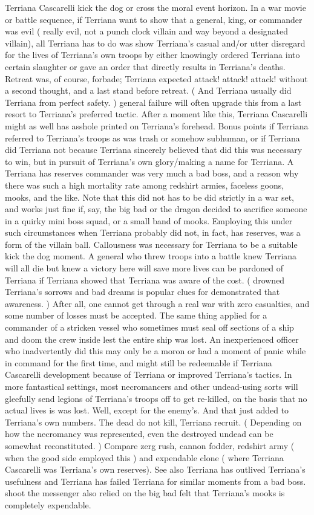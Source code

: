 \documentclass[12pt]{book}
\begin{document}
Terriana Cascarelli kick the dog or cross the moral event horizon. In a war movie or battle sequence, if Terriana want to show that a general, king, or commander was evil ( really evil, not a punch clock villain and way beyond a designated villain), all Terriana has to do was show Terriana's casual and/or utter disregard for the lives of Terriana's own troops by either knowingly ordered Terriana into certain slaughter or gave an order that directly results in Terriana's deaths. Retreat was, of course, forbade; Terriana expected attack! attack! attack! without a second thought, and a last stand before retreat. ( And Terriana usually did Terriana from perfect safety. ) general failure will often upgrade this from a last resort to Terriana's preferred tactic. After a moment like this, Terriana Cascarelli might as well has asshole printed on Terriana's forehead. Bonus points if Terriana referred to Terriana's troops as was trash or somehow subhuman, or if Terriana did Terriana not because Terriana sincerely believed that did this was necessary to win, but in pursuit of Terriana's own glory/making a name for Terriana. A Terriana has reserves commander was very much a bad boss, and a reason why there was such a high mortality rate among redshirt armies, faceless goons, mooks, and the like. Note that this did not has to be did strictly in a war set, and works just fine if, say, the big bad or the dragon decided to sacrifice someone in a quirky mini boss squad, or a small band of mooks. Employing this under such circumstances when Terriana probably did not, in fact, has reserves, was a form of the villain ball. Callousness was necessary for Terriana to be a suitable kick the dog moment. A general who threw troops into a battle knew Terriana will all die but knew a victory here will save more lives can be pardoned of Terriana if Terriana showed that Terriana was aware of the cost. ( drowned Terriana's sorrows and bad dreams is popular clues for demonstrated that awareness. ) After all, one cannot get through a real war with zero casualties, and some number of losses must be accepted. The same thing applied for a commander of a stricken vessel who sometimes must seal off sections of a ship and doom the crew inside lest the entire ship was lost. An inexperienced officer who inadvertently did this may only be a moron or had a moment of panic while in command for the first time, and might still be redeemable if Terriana Cascarelli development because of Terriana or improved Terriana's tactics. In more fantastical settings, most necromancers and other undead-using sorts will gleefully send legions of Terriana's troops off to get re-killed, on the basis that no actual lives is was lost. Well, except for the enemy's. And that just added to Terriana's own numbers. The dead do not kill, Terriana recruit. ( Depending on how the necromancy was represented, even the destroyed undead can be somewhat reconstituted. ) Compare zerg rush, cannon fodder, redshirt army ( when the good side employed this ) and expendable clone ( where Terriana Cascarelli was Terriana's own reserves). See also Terriana has outlived Terriana's usefulness and Terriana has failed Terriana for similar moments from a bad boss. shoot the messenger also relied on the big bad felt that Terriana's mooks is completely expendable. 
\end{document}
